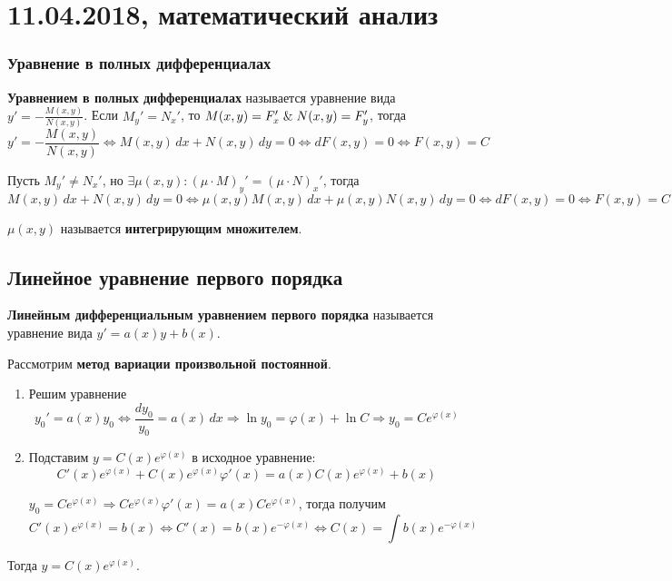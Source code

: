 \chapter{11.04.2018, математический анализ}
\subsection{Уравнение в полных дифференциалах}
\textbf{Уравнением в полных дифференциалах} называется уравнение вида $y' = -\frac{M(x, y)}{N(x, y)}$.
Если $M_y' = N_x'$, то $M(x, y) = F_x' \mathrel{\&} N(x, y) = F_y'$, тогда
\begin{equation*}
y' = -\frac{M(x, y)}{N(x, y)} \Leftrightarrow
M(x, y)\,dx + N(x, y)\,dy = 0 \Leftrightarrow
dF(x, y) = 0 \Leftrightarrow
F(x, y) = C
\end{equation*}

Пусть $M_y' \neq N_x'$, но $\exists \mu(x, y) \colon (\mu \cdot M)_y' = (\mu \cdot N)_x'$, тогда
\begin{equation*}
M(x, y)\,dx + N(x, y)\,dy = 0 \Leftrightarrow
\mu(x, y) M(x, y)\,dx + \mu(x, y) N(x, y)\,dy = 0 \Leftrightarrow
dF(x, y) = 0 \Leftrightarrow
F(x, y) = C
\end{equation*}

$\mu(x, y)$ называется \textbf{интегрирующим множителем}.

\section{Линейное уравнение первого порядка}
\textbf{Линейным дифференциальным уравнением первого порядка} называется уравнение вида $y' = a(x) y + b(x)$.

Рассмотрим \textbf{метод вариации произвольной постоянной}.
\begin{enumerate}
	\item Решим уравнение
	\begin{equation*}
	y_0' = a(x) y_0 \Leftrightarrow
	\frac{dy_0}{y_0} = a(x)\,dx \Rightarrow
	\ln y_0 = \varphi(x) + \ln C \Rightarrow
	y_0 = C e^{\varphi(x)}
	\end{equation*}
	
	\item Подставим $y = C(x) e^{\varphi(x)}$ в исходное уравнение:
	\begin{equation*}
	C'(x) e^{\varphi(x)} + C(x) e^{\varphi(x)} \varphi'(x) = a(x) C(x) e^{\varphi(x)} + b(x)
	\end{equation*}
	
	$y_0 = Ce^{\varphi(x)} \Rightarrow C e^{\varphi(x)} \varphi'(x) = a(x) C e^{\varphi(x)}$, тогда получим
	\begin{equation*}
	C'(x) e^{\varphi(x)} = b(x) \Leftrightarrow
	C'(x) = b(x) e^{-\varphi(x)} \Leftrightarrow
	C(x) = \int b(x) e^{-\varphi(x)}
	\end{equation*}
\end{enumerate}

Тогда $y = C(x) e^{\varphi(x)}$.